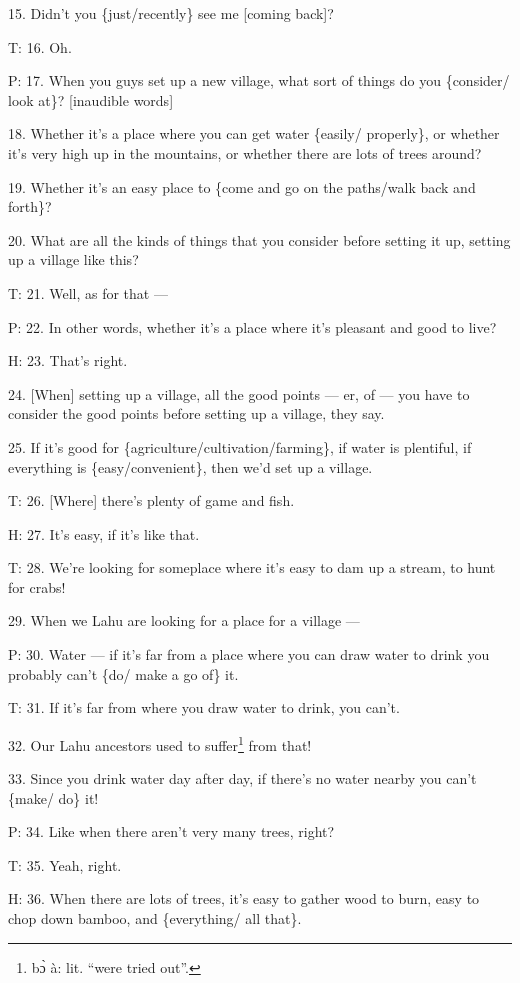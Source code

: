 15. Didn't you \{just/recently\} see me [coming back]?

T: 16. Oh.

P: 17. When you guys set up a new village, what sort of things do you \{consider/
look at\}? [inaudible words]

18. Whether it's a place where you can get water \{easily/ properly\}, or whether
it's very high up in the mountains, or whether there are lots of trees around?

19. Whether it's an easy place to \{come and go on the paths/walk back and forth\}?

20. What are all the kinds of things that you consider before setting it up, setting
up a village like this?

T: 21. Well, as for that ---

P: 22. In other words, whether it's a place where it's pleasant and good to live?

H: 23. That's right.

24. [When] setting up a village, all the good points --- er, of --- you have to
consider the good points before setting up a village, they say.

25. If it's good for \{agriculture/cultivation/farming\}, if water is plentiful,
if everything is \{easy/convenient\}, then we'd set up a village.

T: 26. [Where] there's plenty of game and fish.

H: 27. It's easy, if it's like that.

T: 28. We're looking for someplace where it's easy to dam up a stream, to hunt
for crabs!

29. When we Lahu are looking for a place for a village ---

P: 30. Water --- if it's far from a place where you can draw water to drink you
probably can't \{do/ make a go of\} it.

T: 31. If it's far from where you draw water to drink, you can't.

32. Our Lahu ancestors used to suffer\footnote{bɔ̀ à: lit. ``were tried out''.} from that!

33. Since you drink water day after day, if there's no water nearby you can't \{make/
do\} it!

P: 34. Like when there aren't very many trees, right?

T: 35. Yeah, right.

H: 36. When there are lots of trees, it's easy to gather wood to burn, easy to
chop down bamboo, and \{everything/ all that\}.

